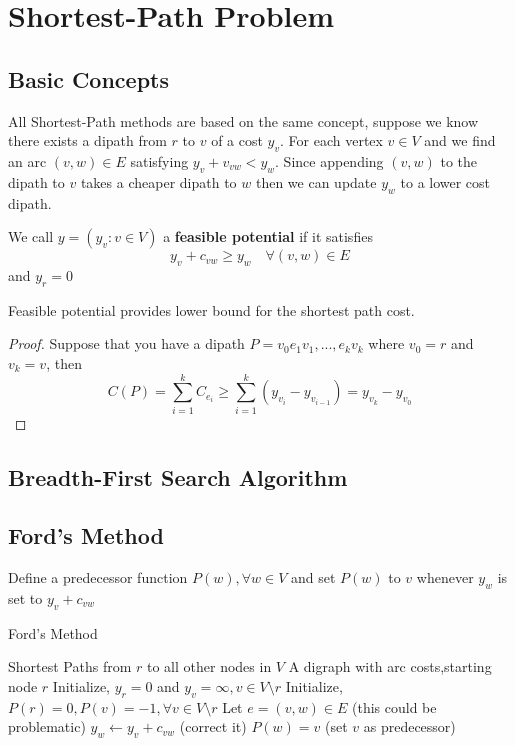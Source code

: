 	\chapter{Shortest-Path Problem}
		\section{Basic Concepts}
			All Shortest-Path methods are based on the same concept, suppose we know there exists a dipath from $r$ to $v$ of a cost $y_v$. For each vertex $v \in V$ and we find an arc $(v, w) \in E$ satisfying $y_v + v_{vw} < y_w$. Since appending $(v, w)$ to the dipath to $v$ takes a cheaper dipath to $w$ then we can update $y_w$ to a lower cost dipath.

			\begin{definition}
				We call $y = (y_v: v\in V)$ a \textbf{feasible potential} if it satisfies
				\begin{equation}
					y_v + c_{vw} \ge y_w \quad \forall (v, w) \in E
				\end{equation}
				and $y_r = 0$
			\end{definition}			

			\begin{proposition}
				Feasible potential provides lower bound for the shortest path cost.
			\end{proposition}

			\begin{proof}
				Suppose that you have a dipath $P = v_0e_1v_1,...,e_kv_k$ where $v_0 = r$ and $v_k = v$, then
				\begin{equation}
					C(P) = \sum_{i=1}^k C_{e_i} \ge \sum_{i=1}^k(y_{v_i} - y_{v_{i-1}}) = y_{v_k} - y_{v_0}
				\end{equation}
			\end{proof}

		\section{Breadth-First Search Algorithm}

		\section{Ford's Method}
			Define a predecessor function $P(w), \forall w \in V$ and set $P(w)$ to $v$ whenever $y_w$ is set to $y_v + c_{vw}$

			\begin{algorithm}
				\caption{Ford's Method}
				\begin{algorithmic}
					\ENSURE Shortest Paths from $r$ to all other nodes in $V$
					\REQUIRE A digraph with arc costs,starting node $r$
					\STATE Initialize, $y_r = 0$ and $y_v = \infty, v\in V\setminus r$
					\STATE Initialize, $P(r) = 0, P(v) = -1, \forall v \in V \setminus r$
						\STATE Let $e = (v, w)\in E$ (this could be problematic)
							\STATE $y_w \gets y_v + c_{vw}$ (correct it)
							\STATE $P(w) = v$ (set $v$ as predecessor)
						\ENDIF
					\ENDWHILE
				\end{algorithmic}
			\end{algorithm}


